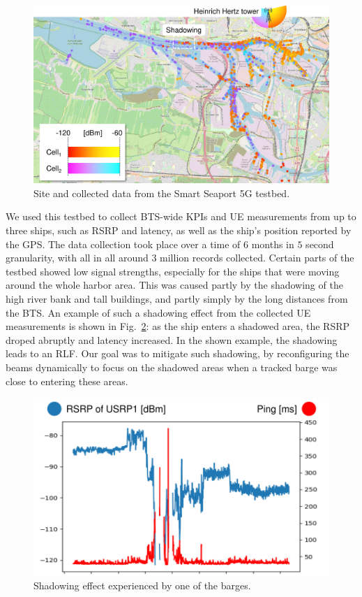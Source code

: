 			\begin{figure}[ht]
				\centering
				\includegraphics[width=0.8\columnwidth]{figures/10_pred_control/pred_control_testbed/pred_control_testbed.pdf}
				\caption[Smart Seaport 5G testbed map]{Site and collected data from the Smart Seaport 5G testbed.}
				\label{fig:pred_control_testbed}
			\end{figure}
		
			We used this testbed to collect \ac{BTS}-wide \acp{KPI} and \ac{UE} measurements from up to three ships, such as \ac{RSRP} and latency, as well as the ship's position reported by the \ac{GPS}.
			The data collection took place over a time of $6$ months in $5$ second granularity, with all in all around $3$ million records collected.			
			Certain parts of the testbed showed low signal strengths, especially for the ships that were moving around the whole harbor area.
			This was caused partly by the shadowing of the high river bank and tall buildings, and partly simply by the long distances from the \ac{BTS}. 
			An example of such a shadowing effect from the collected \ac{UE} measurements is shown in Fig.~\ref{fig:pred_control_shadowing}: as the ship enters a shadowed area, the \ac{RSRP} droped abruptly and latency increased.
			In the shown example, the shadowing leads to an \ac{RLF}.
			Our goal was to mitigate such shadowing, by reconfiguring the beams dynamically to focus on the shadowed areas when a tracked barge was close to entering these areas.

			\begin{figure}[ht]
				\centering
				\includegraphics[width=0.5\columnwidth]{figures/10_pred_control/pred_control_shadowing/pred_control_shadowing.pdf}
				\caption[Shadowing effect in the smart seaport dataset]{Shadowing effect experienced by one of the barges.}
				\label{fig:pred_control_shadowing}
			\end{figure}
	
